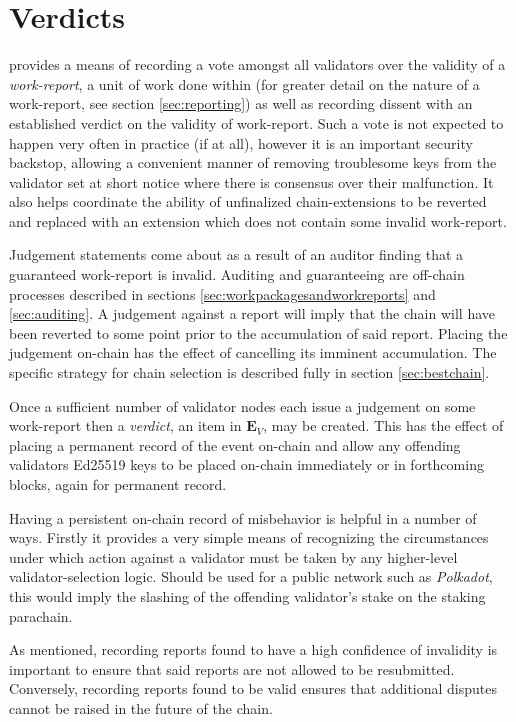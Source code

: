 \section{Verdicts}\label{sec:verdicts}

\Jam provides a means of recording a vote amongst all validators over the validity of a \emph{work-report}, a unit of work done within \Jam (for greater detail on the nature of a work-report, see section \ref{sec:reporting}) as well as recording dissent with an established verdict on the validity of work-report. Such a vote is not expected to happen very often in practice (if at all), however it is an important security backstop, allowing a convenient manner of removing troublesome keys from the validator set at short notice where there is consensus over their malfunction. It also helps coordinate the ability of unfinalized chain-extensions to be reverted and replaced with an extension which does not contain some invalid work-report.

Judgement statements come about as a result of an auditor finding that a guaranteed work-report is invalid. Auditing and guaranteeing are off-chain processes described in sections \ref{sec:workpackagesandworkreports} and \ref{sec:auditing}. A judgement against a report will imply that the chain will have been reverted to some point prior to the accumulation of said report. Placing the judgement on-chain has the effect of cancelling its imminent accumulation. The specific strategy for chain selection is described fully in section \ref{sec:bestchain}.

Once a sufficient number of validator nodes each issue a judgement on some work-report then a \emph{verdict}, an item in $\mathbf{E}_V$, may be created. This has the effect of placing a permanent record of the event on-chain and allow any offending validators Ed25519 keys to be placed on-chain immediately or in forthcoming blocks, again for permanent record.

Having a persistent on-chain record of misbehavior is helpful in a number of ways. Firstly it provides a very simple means of recognizing the circumstances under which action against a validator must be taken by any higher-level validator-selection logic. Should \Jam be used for a public network such as \emph{Polkadot}, this would imply the slashing of the offending validator's stake on the staking parachain.

As mentioned, recording reports found to have a high confidence of invalidity is important to ensure that said reports are not allowed to be resubmitted. Conversely, recording reports found to be valid ensures that additional disputes cannot be raised in the future of the chain.

